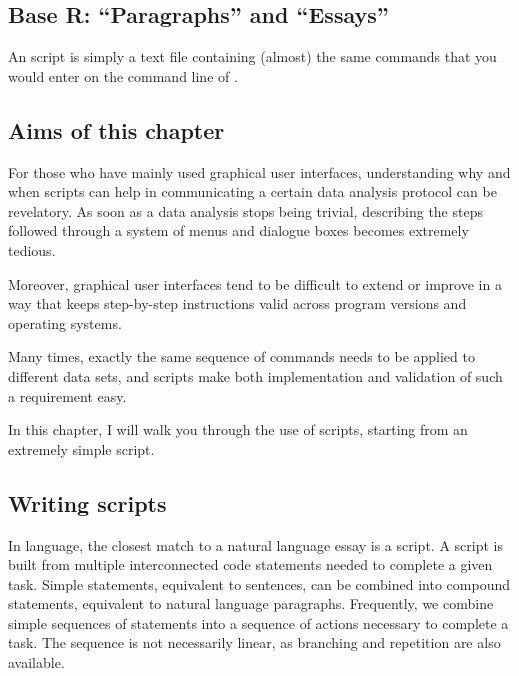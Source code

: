 \begin{playground}
\chapter{Base R: ``Paragraphs'' and ``Essays''}\label{chap:R:scripts}

\begin{VF}
An \Rlang script is simply a text file containing (almost) the same commands that you would enter on the command line of \Rlang.

\nocite{LemonND}
\end{VF}


\section{Aims of this chapter}

For those who have mainly used graphical user interfaces, understanding why and when scripts can help in communicating a certain data analysis protocol can be revelatory. As soon as a data analysis stops being trivial, describing the steps followed through a system of menus and dialogue boxes becomes extremely tedious.

Moreover, graphical user interfaces tend to be difficult to extend or improve in a way that keeps step-by-step instructions valid across program versions and operating systems.

Many times, exactly the same sequence of commands needs to be applied to different data sets, and scripts make both implementation and validation of such a requirement easy.

In this chapter, I will walk you through the use of \Rpgrm scripts, starting from an extremely simple script.

\section{Writing scripts}

In \Rlang language, the closest match to a natural language essay is a script. A script is built from multiple interconnected code statements needed to complete a given task. Simple statements, equivalent to sentences, can be combined into compound statements, equivalent to natural language paragraphs. Frequently, we combine simple sequences of statements into a sequence of actions necessary to complete a task. The sequence is not necessarily linear, as branching and repetition are also available.


\end{playground}

